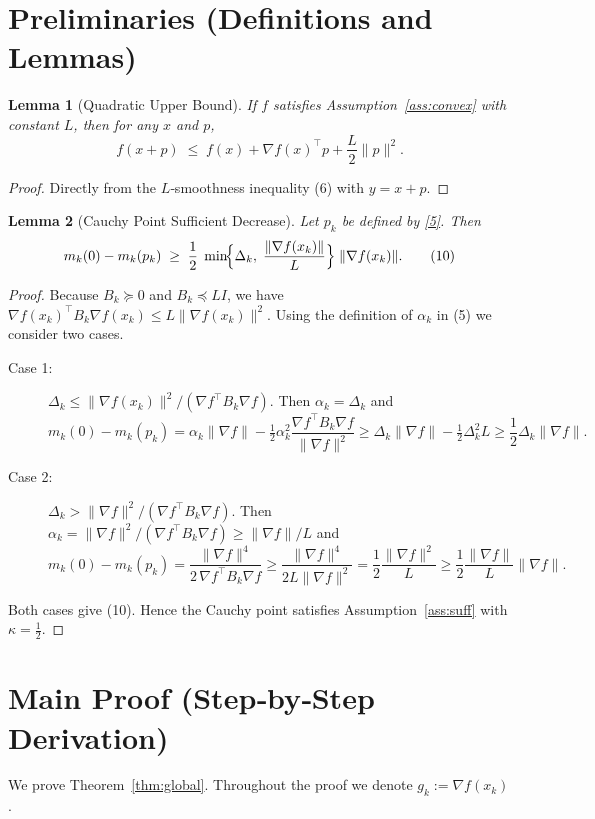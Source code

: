 \documentclass{article}
\newtheorem{lemma}{Lemma}
\begin{document}
\section*{Preliminaries (Definitions and Lemmas)}
\begin{lemma}[Quadratic Upper Bound]\label{lem:quad}
If $f$ satisfies Assumption~\ref{ass:convex} with constant $L$, then for any $x$ and $p$,
\[
f(x+p)\;\le\; f(x)+\nabla f(x)^{\top}p+\frac{L}{2}\|p\|^{2}.
\tag{9}
\]
\end{lemma}
\begin{proof}
Directly from the $L$‑smoothness inequality (6) with $y=x+p$.
\end{proof}

\begin{lemma}[Cauchy Point Sufficient Decrease]\label{lem:cauchy}
Let $p_k$ be defined by \eqref{5}.  Then
\[
m_k(0)-m_k(p_k)\;\ge\;\frac12\;
\min\!\Bigl\{\Delta_k,\;\frac{\|\nabla f(x_k)\|}{L}\Bigr\}
\;\|\nabla f(x_k)\|.
\tag{10}
\]
\end{lemma}
\begin{proof}
Because $B_k\succeq0$ and $B_k\preceq L I$, we have
$\nabla f(x_k)^{\top}B_k\nabla f(x_k)\le L\|\nabla f(x_k)\|^{2}$.  
Using the definition of $\alpha_k$ in (5) we consider two cases.
\begin{description}
\item[Case 1:] $\Delta_k\le \|\nabla f(x_k)\|^{2}/(\nabla f^{\top}B_k\nabla f)$.  
Then $\alpha_k=\Delta_k$ and
\[
m_k(0)-m_k(p_k)=
\alpha_k\|\nabla f\|-\tfrac12\alpha_k^{2}
\frac{\nabla f^{\top}B_k\nabla f}{\|\nabla f\|^{2}}
\ge
\Delta_k\|\nabla f\|-\tfrac12\Delta_k^{2}L
\ge
\frac12\Delta_k\|\nabla f\|.
\]
\item[Case 2:] $\Delta_k> \|\nabla f\|^{2}/(\nabla f^{\top}B_k\nabla f)$.  
Then $\alpha_k= \|\nabla f\|^{2}/(\nabla f^{\top}B_k\nabla f)\ge \|\nabla f\|/L$ and
\[
m_k(0)-m_k(p_k)=
\frac{\|\nabla f\|^{4}}{2\,\nabla f^{\top}B_k\nabla f}
\ge
\frac{\|\nabla f\|^{4}}{2L\|\nabla f\|^{2}}
=
\frac12\frac{\|\nabla f\|^{2}}{L}
\ge
\frac12\frac{\|\nabla f\|}{L}\|\nabla f\|.
\]
\end{description}
Both cases give (10).  Hence the Cauchy point satisfies Assumption~\ref{ass:suff} with $\kappa=\tfrac12$.
\end{proof}

\section*{Main Proof (Step‑by‑Step Derivation)}
We prove Theorem~\ref{thm:global}.  Throughout the proof we denote $g_k:=\nabla f(x_k)$.
\end{document}
